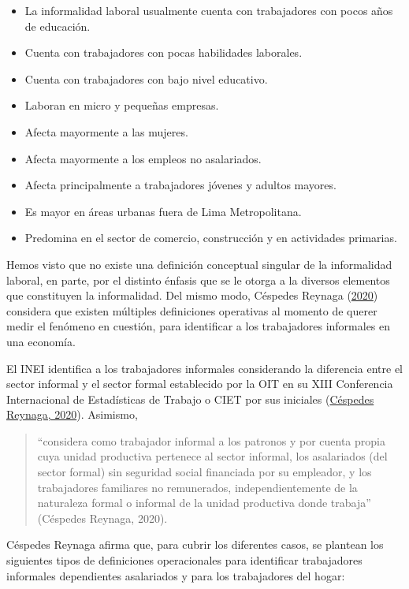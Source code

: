 \documentclass[
  letterpaper,
  12pt,
  oneside,
  spanish,
  doublespacing,
  headsepline,
  parskip]{MastersDoctoralThesis}
\begin{document}
\begin{itemize}
\item
  La informalidad laboral usualmente cuenta con trabajadores con pocos
  años de educación.
\item
  Cuenta con trabajadores con pocas habilidades laborales.
\item
  Cuenta con trabajadores con bajo nivel educativo.
\item
  Laboran en micro y pequeñas empresas.
\item
  Afecta mayormente a las mujeres.
\item
  Afecta mayormente a los empleos no asalariados.
\item
  Afecta principalmente a trabajadores jóvenes y adultos mayores.
\item
  Es mayor en áreas urbanas fuera de Lima Metropolitana.
\item
  Predomina en el sector de comercio, construcción y en actividades
  primarias.
\end{itemize}

Hemos visto que no existe una definición conceptual singular de la
informalidad laboral, en parte, por el distinto énfasis que se le otorga
a la diversos elementos que constituyen la informalidad. Del mismo modo,
Céspedes Reynaga (\protect\hyperlink{ref-cuxe9spedesreynaga2020}{2020})
considera que existen múltiples definiciones operativas al momento de
querer medir el fenómeno en cuestión, para identificar a los
trabajadores informales en una economía.

El INEI identifica a los trabajadores informales considerando la
diferencia entre el sector informal y el sector formal establecido por
la OIT en su XIII Conferencia Internacional de Estadísticas de Trabajo o
CIET por sus iniciales
(\protect\hyperlink{ref-cuxe9spedesreynaga2020}{Céspedes Reynaga,
2020}). Asimismo,

\begin{quote}
``considera como trabajador informal a los patronos y por cuenta propia
cuya unidad productiva pertenece al sector informal, los asalariados
(del sector formal) sin seguridad social financiada por su empleador, y
los trabajadores familiares no remunerados, independientemente de la
naturaleza formal o informal de la unidad productiva donde trabaja''
(Céspedes Reynaga, 2020).
\end{quote}

Céspedes Reynaga afirma que, para cubrir los diferentes casos, se
plantean los siguientes tipos de definiciones operacionales para
identificar trabajadores informales dependientes asalariados y para los
trabajadores del hogar:
\end{document}
